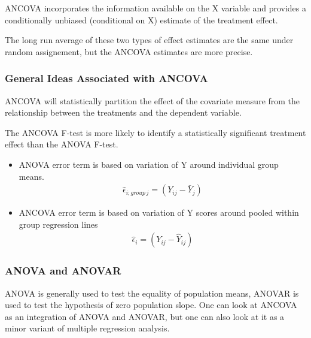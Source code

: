 \documentclass[a4paper]{article}
\begin{document}
ANCOVA incorporates the information available on the X variable and provides a conditionally unbiased (conditional on X) estimate of the treatment effect.


The long run average of these two types of effect estimates are the same under random assignement, but the ANCOVA estimates are more precise. 

\subsubsection*{General Ideas Associated with ANCOVA}
ANCOVA will statistically partition the effect of the covariate measure from the relationship between the treatments and the dependent variable.

The ANCOVA F-test is more likely to identify a statistically significant treatment effect than the ANOVA F-test.

\begin{itemize}
  \item ANOVA error term is based on variation of Y around individual group means.
  \begin{align}
    \hat{\epsilon}_{i;group\, j}  = (Y_{ij} - \bar{Y}_j)
  \end{align}
  \item ANCOVA error term is based on variation of Y scores around pooled within group regression lines
  \begin{align}
    \hat{\epsilon}_i  = (Y_{ij} - \hat{Y}_{ij})
  \end{align}
\end{itemize}

\subsubsection*{ANOVA and ANOVAR}
ANOVA is generally used to test the equality of population means, ANOVAR is used to test the hypothesis of zero population slope. 
One can look at ANCOVA as an integration of ANOVA and ANOVAR, but one can also look at it as a minor variant of multiple regression analysis. 
\end{document}
